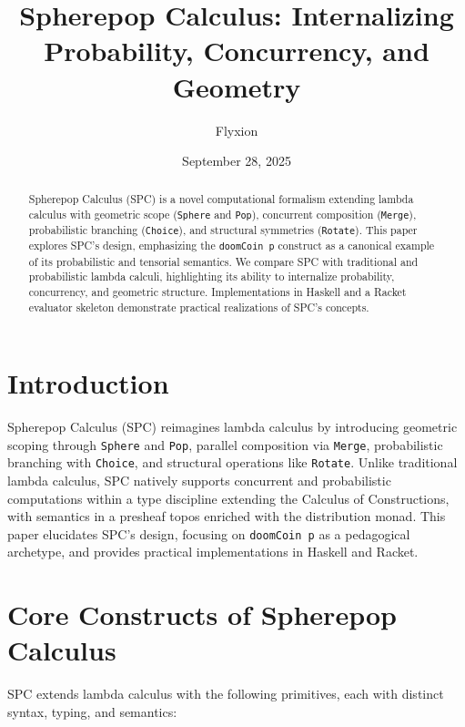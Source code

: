 \documentclass{article}
\begin{document}
\title{Spherepop Calculus: Internalizing Probability, Concurrency, and Geometry}
\author{Flyxion}
\date{September 28, 2025}
\maketitle

\begin{abstract}
Spherepop Calculus (SPC) is a novel computational formalism extending lambda calculus with geometric scope (\texttt{Sphere} and \texttt{Pop}), concurrent composition (\texttt{Merge}), probabilistic branching (\texttt{Choice}), and structural symmetries (\texttt{Rotate}). This paper explores SPC’s design, emphasizing the \texttt{doomCoin p} construct as a canonical example of its probabilistic and tensorial semantics. We compare SPC with traditional and probabilistic lambda calculi, highlighting its ability to internalize probability, concurrency, and geometric structure. Implementations in Haskell and a Racket evaluator skeleton demonstrate practical realizations of SPC’s concepts.
\end{abstract}

\section{Introduction}
Spherepop Calculus (SPC) reimagines lambda calculus by introducing geometric scoping through \texttt{Sphere} and \texttt{Pop}, parallel composition via \texttt{Merge}, probabilistic branching with \texttt{Choice}, and structural operations like \texttt{Rotate}. Unlike traditional lambda calculus, SPC natively supports concurrent and probabilistic computations within a type discipline extending the Calculus of Constructions, with semantics in a presheaf topos enriched with the distribution monad. This paper elucidates SPC’s design, focusing on \texttt{doomCoin p} as a pedagogical archetype, and provides practical implementations in Haskell and Racket.

\section{Core Constructs of Spherepop Calculus}
SPC extends lambda calculus with the following primitives, each with distinct syntax, typing, and semantics:
\end{document}
